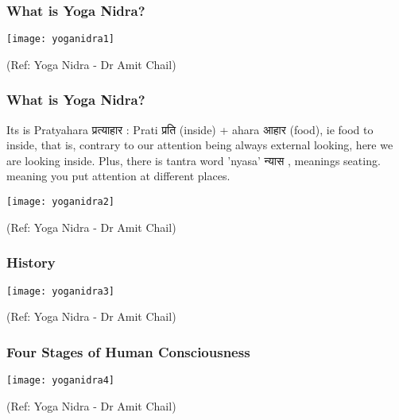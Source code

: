 \begin{frame}[fragile]\frametitle{What is Yoga Nidra?}
      \begin{center}
        \texttt{[image: yoganidra1]}

		{\tiny (Ref: Yoga Nidra - Dr Amit Chail)}		
        \end{center}

\end{frame}

\begin{frame}[fragile]\frametitle{What is Yoga Nidra?}
Its is Pratyahara प्रत्याहार  : Prati प्रति (inside) + ahara आहार  (food), ie food to inside, that is, contrary to our attention being always external looking, here we are looking inside. Plus, there is tantra word 'nyasa' न्यास , meanings seating. meaning you put attention at different places.

      \begin{center}
        \texttt{[image: yoganidra2]}

		{\tiny (Ref: Yoga Nidra - Dr Amit Chail)}		
        \end{center}

\end{frame}

\begin{frame}[fragile]\frametitle{History}
      \begin{center}
        \texttt{[image: yoganidra3]}

		{\tiny (Ref: Yoga Nidra - Dr Amit Chail)}		
        \end{center}

\end{frame}

\begin{frame}[fragile]\frametitle{Four Stages of Human Consciousness}
      \begin{center}
        \texttt{[image: yoganidra4]}

		{\tiny (Ref: Yoga Nidra - Dr Amit Chail)}		
        \end{center}

\end{frame}

